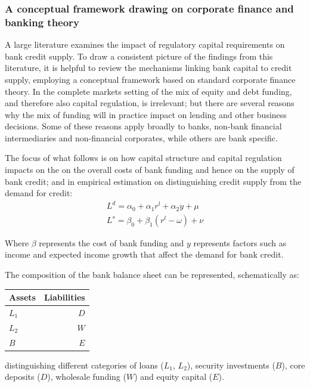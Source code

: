 \documentclass[
  12,
]{article}
\begin{document}
\hypertarget{a-conceptual-framework-drawing-on-corporate-finance-and-banking-theory}{%
\subsubsection{A conceptual framework drawing on corporate finance and banking theory}\label{a-conceptual-framework-drawing-on-corporate-finance-and-banking-theory}}

A large literature examines the impact of regulatory capital requirements on bank credit supply. To draw a consistent picture of the findings from this literature, it is helpful to review the mechanisms linking bank capital to credit supply, employing a conceptual framework based on standard corporate finance theory. In the complete markets setting of \citet{modigliani58} the mix of equity and debt funding, and therefore also capital regulation, is irrelevant; but there are several reasons why the mix of funding will in practice impact on lending and other business decisions. Some of these reasons apply broadly to banks, non-bank financial intermediaries and non-financial corporates, while others are bank specific.

The focus of what follows is on how capital structure and capital regulation impacts on the on the overall costs of bank funding and hence on the supply of bank credit; and in empirical estimation on distinguishing credit supply from the demand for credit:
\[
\begin{split}
L^d =\alpha_0+\alpha_1 r^l+\alpha_2 y + \mu\\
L^s =\beta_0+\beta_1 (r^l-\omega)+\nu 
\end{split}
\]

Where \(\beta\) represents the cost of bank funding and \(y\) represents factors such as income and expected income growth that affect the demand for bank credit.

The composition of the bank balance sheet can be represented, schematically as:

\begin{center}
\begin{tabular}{ l | r}
Assets  & Liabilities \\
\hline
$L_1$   & $D$ \\
$L_2$   & $W$ \\
$B$ & $E$ \\
\hline
\end{tabular}
\end{center}

distinguishing different categories of loans (\(L_1\), \(L_2\)), security investments (\(B\)), core deposits (\(D\)), wholesale funding (\(W\)) and equity capital (\(E\)).
\end{document}
